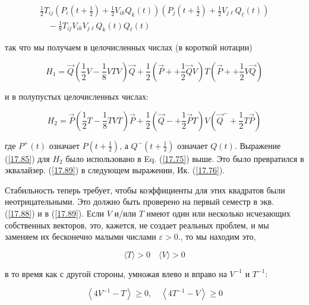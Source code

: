 \documentclass[main.tex]{subfiles}
\begin{document}
\begin{equation}\label{17.87}
\begin{array}{l}
\frac{1}{2} T_{i j}\left(P_{i}\left(t+\frac{1}{2}\right)+\frac{1}{2} V_{i k} Q_{k}(t)\right)\left(P_{j}\left(t+\frac{1}{2}\right)+\frac{1}{2} V_{j \ell} Q_{\ell}(t)\right) \\
\quad-\frac{1}{8} T_{i j} V_{i k} V_{j \ell} Q_{k}(t) Q_{\ell}(t)
\end{array}
\end{equation}

так что мы получаем в целочисленных числах (в короткой нотации)

\begin{equation}\label{17.88}
H_{1}=\vec{Q}\left(\frac{1}{2} V-\frac{1}{8} V T V\right) \vec{Q}+\frac{1}{2}\left(\vec{P}++\frac{1}{2} \vec{Q} V\right) T\left(\vec{P}++\frac{1}{2} V \vec{Q}\right)
\end{equation}

и в полупустых целочисленных числах:

\begin{equation}\label{17.89}
H_{2}=\vec{P}\left(\frac{1}{2} T-\frac{1}{8} T V T\right) \vec{P}+\frac{1}{2}\left(\vec{Q}-+\frac{1}{2} \vec{P} T\right) V\left(\vec{Q}^{-}+\frac{1}{2} T \vec{P}\right)
\end{equation}

где $P^+ (t)$ означает $P(t + \frac 1 2)$, а $Q^- (t + \frac 1 2)$ означает $Q(t)$.
Выражение (\ref{17.85}) для $H_2$ было использовано в Eq. (\ref{17.75}) выше. Это было
превратился в эквалайзер. (\ref{17.89}) в следующем выражении, Ик. (\ref{17.76}).

Стабильность теперь требует, чтобы коэффициенты для этих квадратов были неотрицательными. Это должно быть проверено на первый семестр в экв. (\ref{17.88}) и в (\ref{17.89}). Если $V$ и/или $T$ имеют один или несколько исчезающих собственных векторов, это, кажется, не создает реальных проблем, и мы заменяем их бесконечно малыми числами $\varepsilon>0$., то мы находим это,

\begin{equation}\label{17.90}
	\langle T\rangle> 0 \quad \langle V\rangle> 0
\end{equation}

в то время как с другой стороны, умножая влево и вправо на $V^{-1}$ и $T^{-1}$:

\begin{equation}\label{17.91}
\left\langle 4 V^{-1}-T\right\rangle \geq 0, \quad\left\langle 4 T^{-1}-V\right\rangle \geq 0
\end{equation}
\end{document}
